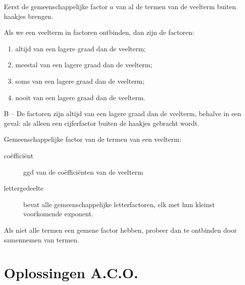 \documentclass[12pt]{article}
\begin{document}
\begin{solution}
\begin{enumerate}[(a)]
		Eerst de gemeenschappelijke factor $a$ van al de termen van de veelterm buiten haakjes brengen.
\end{enumerate}
\end{solution}

\begin{exercise}
Als we een veelterm in factoren ontbinden, dan zijn de factoren:
\begin{enumerate}[A  ]
  \item altijd van een lagere graad dan de veelterm;
  \item meestal van een lagere graad dan de veelterm;
  \item soms van een lagere graad dan de veelterm;
  \item nooit van een lagere graad dan de veelterm.
\end{enumerate}
\end{exercise}

\begin{solution}
B -- De factoren zijn altijd van een lagere graad dan de veelterm, behalve in een geval: als alleen een cijferfactor buiten de haakjes gebracht wordt.
\end{solution}

\begin{onthoud}
Gemeenschappelijke factor van de termen van een veelterm:
\begin{description}
  \item[coëfficiënt]  ggd van de coëfficiënten van de veelterm
  \item[lettergedeelte] bevat alle gemeenschappelijke letterfactoren, elk met hun 
			kleinst voorkomende exponent.
\end{description}
Als niet alle termen een gemene factor hebben, probeer dan te ontbinden door samennemen van termen.
\end{onthoud}

\newpage
\section*{Oplossingen A.C.O.}

\immediate\closeout\solutionstream

\end{document}
